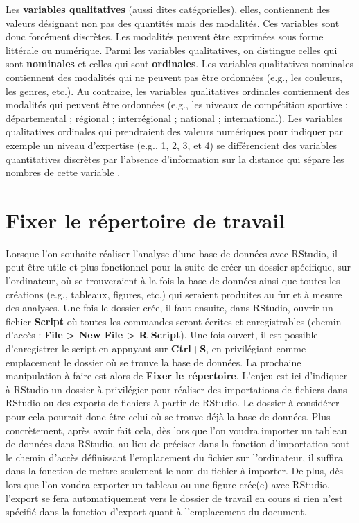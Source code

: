 \documentclass[
  french,
]{book}
\begin{document}
Les \textbf{variables qualitatives} (aussi dites catégorielles), elles, contiennent des valeurs désignant non pas des quantités mais des modalités. Ces variables sont donc forcément discrètes. Les modalités peuvent être exprimées sous forme littérale ou numérique. Parmi les variables qualitatives, on distingue celles qui sont \textbf{nominales} et celles qui sont \textbf{ordinales}. Les variables qualitatives nominales contiennent des modalités qui ne peuvent pas être ordonnées (e.g., les couleurs, les genres, etc.). Au contraire, les variables qualitatives ordinales contiennent des modalités qui peuvent être ordonnées (e.g., les niveaux de compétition sportive : départemental ; régional ; interrégional ; national ; international). Les variables qualitatives ordinales qui prendraient des valeurs numériques pour indiquer par exemple un niveau d'expertise (e.g., 1, 2, 3, et 4) se différencient des variables quantitatives discrètes par l'absence d'information sur la distance qui sépare les nombres de cette variable \autocite{labreucheDifferentsTypesVariables2010}.

\hypertarget{fixer-le-ruxe9pertoire-de-travail}{%
\section{Fixer le répertoire de travail}\label{fixer-le-ruxe9pertoire-de-travail}}

Lorsque l'on souhaite réaliser l'analyse d'une base de données avec RStudio, il peut être utile et plus fonctionnel pour la suite de créer un dossier spécifique, sur l'ordinateur, où se trouveraient à la fois la base de données ainsi que toutes les créations (e.g., tableaux, figures, etc.) qui seraient produites au fur et à mesure des analyses. Une fois le dossier crée, il faut ensuite, dans RStudio, ouvrir un fichier \textbf{Script} où toutes les commandes seront écrites et enregistrables (chemin d'accès : \textbf{File \textgreater{} New File \textgreater{} R Script}). Une fois ouvert, il est possible d'enregistrer le script en appuyant sur \textbf{Ctrl+S}, en privilégiant comme emplacement le dossier où se trouve la base de données.
La prochaine manipulation à faire est alors de \textbf{Fixer le répertoire}. L'enjeu est ici d'indiquer à RStudio un dossier à privilégier pour réaliser des importations de fichiers dans RStudio ou des exports de fichiers à partir de RStudio. Le dossier à considérer pour cela pourrait donc être celui où se trouve déjà la base de données. Plus concrètement, après avoir fait cela, dès lors que l'on voudra importer un tableau de données dans RStudio, au lieu de préciser dans la fonction d'importation tout le chemin d'accès définissant l'emplacement du fichier sur l'ordinateur, il suffira dans la fonction de mettre seulement le nom du fichier à importer. De plus, dès lors que l'on voudra exporter un tableau ou une figure crée(e) avec RStudio, l'export se fera automatiquement vers le dossier de travail en cours si rien n'est spécifié dans la fonction d'export quant à l'emplacement du document.
\end{document}
